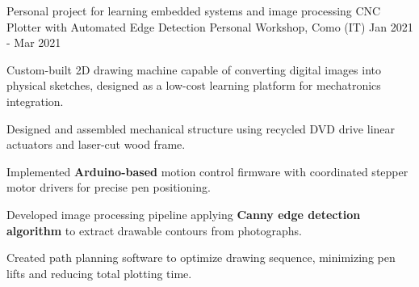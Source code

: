 
\cventry
{Personal project for learning embedded systems and image processing}
{CNC Plotter with Automated Edge Detection}
{Personal Workshop, Como (IT)}
{Jan 2021 - Mar 2021}
{
    Custom-built 2D drawing machine capable of converting digital images into physical sketches, designed as a low-cost learning platform for mechatronics integration.
    \newline
    \vspace{4mm}
    \begin{cvitems}
        \item {Designed and assembled mechanical structure using recycled DVD drive linear actuators and laser-cut wood frame.}
        \item {Implemented \textbf{Arduino-based} motion control firmware with coordinated stepper motor drivers for precise pen positioning.}
        \item {Developed image processing pipeline applying \textbf{Canny edge detection algorithm} to extract drawable contours from photographs.}
        \item {Created path planning software to optimize drawing sequence, minimizing pen lifts and reducing total plotting time.}
    \end{cvitems}
}
